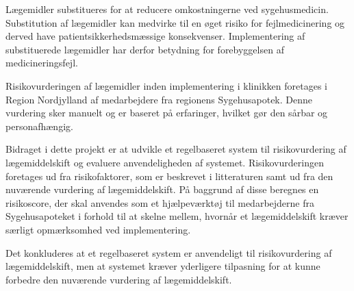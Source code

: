 \vspace{-0.3cm}
Lægemidler substitueres for at reducere omkostningerne ved sygehusmedicin. Substitution af lægemidler kan medvirke til en øget risiko for fejlmedicinering og derved have patientsikkerhedsmæssige konsekvenser. Implementering af substituerede lægemidler har derfor betydning for forebyggelsen af medicineringsfejl. 

Risikovurderingen af lægemidler inden implementering i klinikken foretages i Region Nordjylland af medarbejdere fra regionens Sygehusapotek. Denne vurdering sker manuelt og er baseret på erfaringer, hvilket gør den sårbar og personafhængig. 


Bidraget i dette projekt er at udvikle et regelbaseret system til risikovurdering af lægemiddelskift og evaluere anvendeligheden af systemet. Risikovurderingen foretages ud fra risikofaktorer, som er beskrevet i litteraturen samt ud fra den nuværende vurdering af lægemiddelskift. På baggrund af disse beregnes en risikoscore, der skal anvendes som et hjælpeværktøj til medarbejderne fra Sygehusapoteket i forhold til at skelne mellem, hvornår et lægemiddelskift kræver særligt opmærksomhed ved implementering.

Det konkluderes at et regelbaseret system er anvendeligt til risikovurdering af lægemiddelskift, men at systemet kræver yderligere tilpasning for at kunne forbedre den nuværende vurdering af lægemiddelskift.
\vspace{-0.2cm}